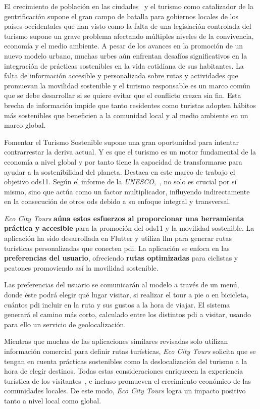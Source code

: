 
El crecimiento de población en las ciudades~\cite{nieuwenhuijsen_urban_2020} y el turismo como catalizador de la gentrificación supone el gran campo de batalla para gobiernos locales de los países occidentales que han visto como la falta de una legislación controlada del turismo supone un grave problema afectando múltiples niveles de la convivencia, economía y el medio ambiente. A pesar de los avances en la promoción de un nuevo modelo urbano, muchas urbes aún enfrentan desafíos significativos en la integración de prácticas sostenibles en la vida cotidiana de sus habitantes. La falta de información accesible y personalizada sobre rutas y actividades que promuevan la movilidad sostenible y el turismo responsable es un marco común que se debe desarrollar si se quiere evitar que el conflicto crezca sin fin. Esta brecha de información impide que tanto residentes como turistas adopten hábitos más sostenibles que beneficien a la comunidad local y al medio ambiente en un marco global.

Fomentar el Turismo Sostenible supone una gran oportunidad para intentar contrarrestar la deriva actual. Y es que el turismo es un motor fundamental de la economía a nivel global y por tanto tiene la capacidad de transformarse para ayudar a la sostenibilidad del planeta.  Destaca en este marco de trabajo el  objetivo \acrfull{ods11}. Según el informe de la \textit{UNESCO},~\cite{ionescu_progress_2024}, no solo es crucial por sí mismo, sino que actúa como un factor multiplicador, influyendo indirectamente en la consecución de otros \acrshort{ods} debido a su enfoque integral y transversal.

\textit{Eco City Tours} \textbf{aúna estos esfuerzos al proporcionar una herramienta práctica y accesible} para la promoción del \acrshort{ods11} y la movilidad sostenible. La aplicación ha sido desarrollada en Flutter y utiliza \acrfull{llm} para generar rutas turísticas personalizadas que conecten \acrfull{pdi}. La aplicación se enfoca en las \textbf{preferencias del usuario}, ofreciendo \textbf{rutas optimizadas} para ciclistas y peatones promoviendo así la movilidad sostenible.

Las preferencias del usuario se comunicarán al modelo a través de un menú, donde éste podrá elegir qué lugar visitar, si realizar el tour a pie o en bicicleta, cuántos \acrlong{pdi} incluir en la ruta y sus gustos a la hora de viajar. El sistema generará el camino más corto, calculado entre los distintos \acrshort{pdi} a visitar, usando para ello un servicio de geolocalización.

Mientras que muchas de las aplicaciones similares revisadas solo utilizan información comercial para definir rutas turísticas, \textit{Eco City Tours} solicita que se tengan en cuenta prácticas sostenibles como la deslocalización del turismo a la hora de elegir destinos. Todas estas consideraciones enriquecen la experiencia turística de los visitantes~\cite{mitas_tell_2023}, e incluso promueven el crecimiento económico de las comunidades locales. De este modo, \textit{Eco City Tours} logra un impacto positivo tanto a nivel local como global.